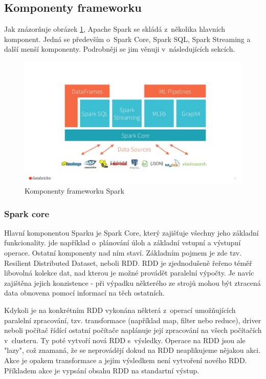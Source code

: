 \documentclass[thesis=B,czech]{FITthesis}[2012/06/26]
\begin{document}
\subsection{Komponenty frameworku}
	Jak znázorňuje obrázek \ref{fig:spark_components}, Apache Spark se skládá z~několika hlavních komponent. Jedná se především o~Spark Core, Spark SQL, Spark Streaming a další menší komponenty. Podrobněji se jim věnuji v~následujících sekcích. 
	\begin{figure}[ht]
    	\centering
    	\includegraphics[width=1\textwidth]{images/spark_engine.jpg}
    	\caption{Komponenty frameworku Spark\cite{spark-components}}
    	\label{fig:spark_components}
	\end{figure}
	
\subsubsection{Spark core}
\label{spark-core}
	Hlavní komponentou Sparku je Spark Core, který zajišťuje všechny jeho základní funkcionality. jde například o~plánování úloh a základní vstupní a výstupní operace. Ostatní komponenty nad ním staví. Základním pojmem je zde tzv. Resilient Distributed Dataset, neboli RDD. RDD je zjednodušeně řeřeno téměř libovolná kolekce dat, nad kterou je možné provádět paralelní výpočty. Je navíc zajištěna jejich konzistence - při výpadku některého ze strojů mohou být ztracená data obnovena pomocí informací na těch ostatních. 
	
	Kdykoli je na konkrétním RDD vykonána některá z~operací umožňujících paralelní zpracování, tzv. transformace (například map, filter nebo reduce), driver neboli počítač řídící ostatní počítače naplánuje její zpracování na všech počítačích v~clusteru. Ty poté vytvoří nová RDD s~výsledky. Operace na RDD jsou ale "lazy", což znamaná, že se neprovádějí dokud na RDD neaplikujeme nějakou akci. Akce je opakem transformace a jejím výsledkem není vytvoření nového RDD. Příkladem akce je vypsání obsahu RDD na standartní výstup. 
\end{document}
